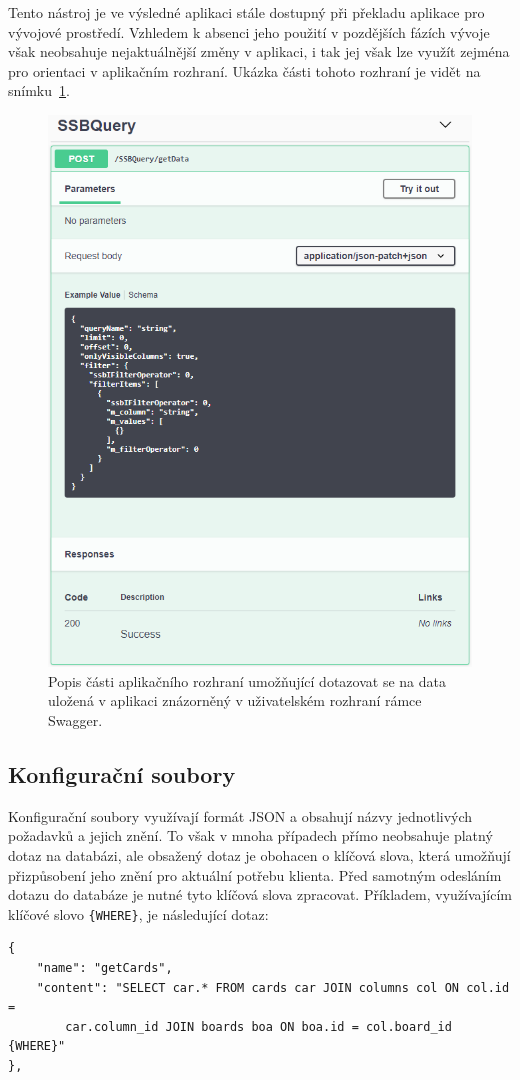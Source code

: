 Tento nástroj je ve výsledné aplikaci stále dostupný při překladu aplikace pro vývojové prostředí. Vzhledem k absenci jeho použití v pozdějších fázích vývoje však neobsahuje nejaktuálnější změny v aplikaci, i tak jej však lze využít zejména pro orientaci v aplikačním rozhraní. Ukázka části tohoto rozhraní je vidět na snímku~\ref{img:swagger}.

\begin{figure}[H]
	\centering
	\label{img:swagger}
	\includegraphics[width=\textwidth]{obrazky-figures/swagger.png}
	\caption{Popis části aplikačního rozhraní umožňující dotazovat se na data uložená v aplikaci znázorněný v uživatelském rozhraní rámce Swagger.}
\end{figure}

\subsection{Konfigurační soubory}
Konfigurační soubory využívají formát JSON a obsahují názvy jednotlivých požadavků a jejich znění. To však v mnoha případech přímo neobsahuje platný dotaz na databázi, ale obsažený dotaz je obohacen o klíčová slova, která umožňují přizpůsobení jeho znění pro aktuální potřebu klienta. Před samotným odesláním dotazu do databáze je nutné tyto klíčová slova zpracovat. Příkladem, využívajícím klíčové slovo \texttt{\{WHERE\}}, je následující dotaz:
\begin{verbatim}
{
    "name": "getCards",
    "content": "SELECT car.* FROM cards car JOIN columns col ON col.id = 
        car.column_id JOIN boards boa ON boa.id = col.board_id {WHERE}"
},
\end{verbatim}


